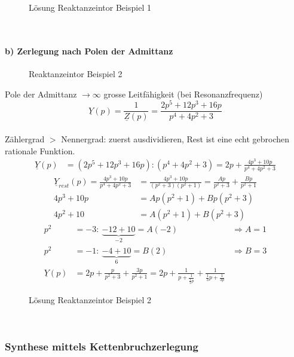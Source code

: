 \begin{figure}[!h]
	\centering
	
	\caption{Lösung Reaktanzeintor Beispiel 1}
	\label{fig:RetSyntheseBsp1SL}
\end{figure}\\


\paragraph{b) Zerlegung nach Polen der Admittanz}
\begin{figure}[!ht]
	\centering
	
	\caption{Reaktanzeintor Beispiel 2}
	\label{fig:RetSyntheseBsp2}
\end{figure}

Pole der Admittanz $\rightarrow \infty$ grosse Leitfähigkeit (bei
Resonanzfrequenz)\\
$$\underline{Y}(p)=\frac{1}{\underline{Z}(p)}=\frac{2p^5+12p^3+16p}{p^4+4p^2+3}$$\\
Zählergrad $>$ Nennergrad: zuerst ausdividieren, Rest ist eine echt gebrochen
rationale Funktion.
\begin{align}
\underline{Y}(p)&=(2p^5+12p^3+16p):(p^4+4p^2+3)=2p+\frac{4p^3+10p}{p^4+4p^2+3}\nonumber
\end{align}
\begin{align}
\underline{Y}_{rest}(p)=\frac{4p^3+10p}{p^4+4p^2+3}&=\frac{4p^3+10p}{(p^2+3)(p^2+1)}=\frac{Ap}{p^2+3}+\frac{Bp}{p^2+1}\nonumber\\
4p^3+10p&=Ap(p^2+1)+Bp(p^2+3)\nonumber\\
4p^2+10&=A(p^2+1)+B(p^2+3)\nonumber
\end{align}
\begin{align}
p^2&=-3:\ \underbrace{-12+10}_{-2}=A(-2) &\Rightarrow A=1\nonumber\\
p^2&=-1:\ \underbrace{-4+10}_{6}=B(2) &\Rightarrow B=3\nonumber\\
\underline{Y}(p)&=2p+\frac{p}{p^2+3}+\frac{3p}{p^2+1}=2p+\frac{1}{p+\frac{1}{\frac{1}{3}p}}+\frac{1}{\frac{1}{3}p+\frac{1}{3p}}\nonumber
\end{align}
\begin{figure}[!ht]
	\centering
	
	\caption{Lösung Reaktanzeintor Beispiel 2}
	\label{fig:RetSyntheseBsp2L}
\end{figure}\\


\subsubsection{Synthese mittels Kettenbruchzerlegung}
